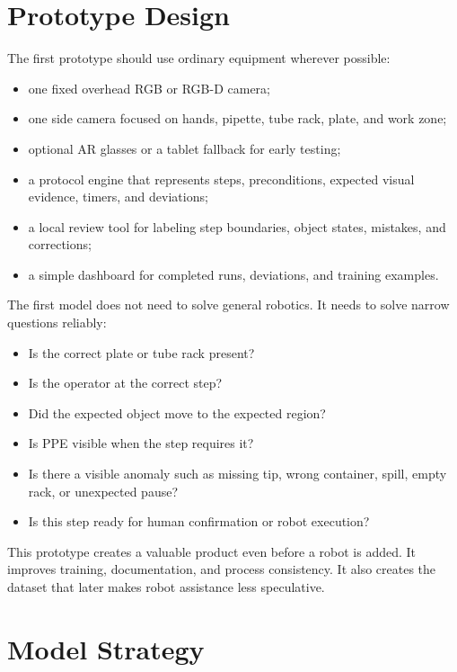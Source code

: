 \documentclass[11pt]{article}
\begin{document}
\section{Prototype Design}

The first prototype should use ordinary equipment wherever possible:

\begin{itemize}
  \item one fixed overhead RGB or RGB-D camera;
  \item one side camera focused on hands, pipette, tube rack, plate, and work zone;
  \item optional AR glasses or a tablet fallback for early testing;
  \item a protocol engine that represents steps, preconditions, expected visual evidence, timers, and deviations;
  \item a local review tool for labeling step boundaries, object states, mistakes, and corrections;
  \item a simple dashboard for completed runs, deviations, and training examples.
\end{itemize}

The first model does not need to solve general robotics. It needs to solve narrow questions reliably:

\begin{itemize}
  \item Is the correct plate or tube rack present?
  \item Is the operator at the correct step?
  \item Did the expected object move to the expected region?
  \item Is PPE visible when the step requires it?
  \item Is there a visible anomaly such as missing tip, wrong container, spill, empty rack, or unexpected pause?
  \item Is this step ready for human confirmation or robot execution?
\end{itemize}

This prototype creates a valuable product even before a robot is added. It improves training, documentation, and process consistency. It also creates the dataset that later makes robot assistance less speculative.

\section{Model Strategy}
\end{document}
